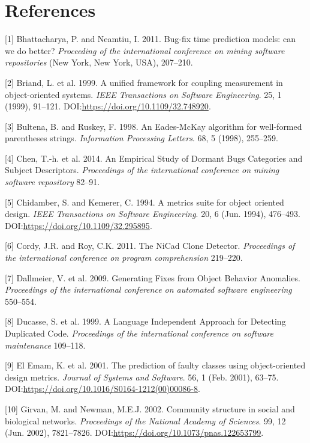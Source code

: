 \documentclass[sigconf]{acmart}
\begin{document}
\section*{References}

\setlength{\parindent}{0pt} \setlength{\parskip}{0.5em}


[1] Bhattacharya, P. and Neamtiu, I. 2011. Bug-fix time prediction
models: can we do better? \emph{Proceeding of the international
conference on mining software repositories} (New York, New York, USA),
207--210.

[2] Briand, L. et al. 1999. A unified framework for coupling
measurement in object-oriented systems. \emph{IEEE Transactions on
Software Engineering}. 25, 1 (1999), 91--121.
DOI:\url{https://doi.org/10.1109/32.748920}.

[3] Bultena, B. and Ruskey, F. 1998. An Eades-McKay algorithm for
well-formed parentheses strings. \emph{Information Processing Letters}.
68, 5 (1998), 255--259.

[4] Chen, T.-h. et al. 2014. An Empirical Study of Dormant Bugs
Categories and Subject Descriptors. \emph{Proceedings of the
international conference on mining software repository} 82--91.

[5] Chidamber, S. and Kemerer, C. 1994. A metrics suite for object
oriented design. \emph{IEEE Transactions on Software Engineering}. 20, 6
(Jun. 1994), 476--493. DOI:\url{https://doi.org/10.1109/32.295895}.

[6] Cordy, J.R. and Roy, C.K. 2011. The NiCad Clone Detector.
\emph{Proceedings of the international conference on program
comprehension} 219--220.

[7] Dallmeier, V. et al. 2009. Generating Fixes from Object Behavior
Anomalies. \emph{Proceedings of the international conference on
automated software engineering} 550--554.

[8] Ducasse, S. et al. 1999. A Language Independent Approach for
Detecting Duplicated Code. \emph{Proceedings of the international
conference on software maintenance} 109--118.

[9] El Emam, K. et al. 2001. The prediction of faulty classes using
object-oriented design metrics. \emph{Journal of Systems and Software}.
56, 1 (Feb. 2001), 63--75.
DOI:\url{https://doi.org/10.1016/S0164-1212(00)00086-8}.

[10] Girvan, M. and Newman, M.E.J. 2002. Community structure in
social and biological networks. \emph{Proceedings of the National
Academy of Sciences}. 99, 12 (Jun. 2002), 7821--7826.
DOI:\url{https://doi.org/10.1073/pnas.122653799}.
\end{document}
